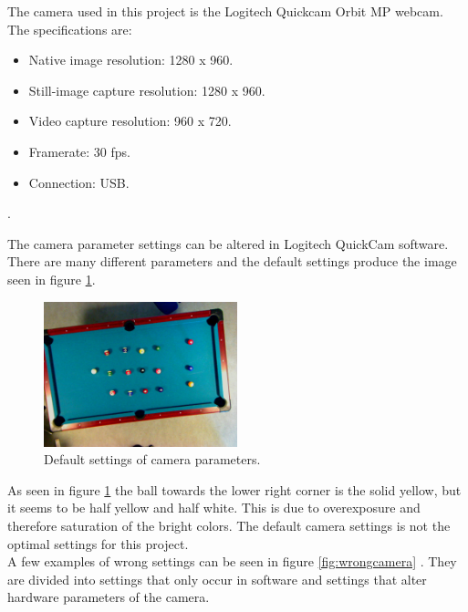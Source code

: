 The camera used in this project is the Logitech Quickcam Orbit MP webcam. The specifications are:

\begin{itemize}
\setlength{\itemsep}{0mm}
	\item Native image resolution: 1280 x 960.
	\item Still-image capture resolution: 1280 x 960.
	\item Video capture resolution: 960 x 720.
	\item Framerate: 30 fps.
	\item Connection: USB.
\end{itemize}.

The camera parameter settings can be altered in Logitech QuickCam software. There are many different parameters and the default settings produce the image seen in figure \ref{fig:defaultcamera}.

\begin{figure}[H]
\begin{center}
\leavevmode
\includegraphics[width=0.5\textwidth]{images/default}
\end{center}
\caption{Default settings of camera parameters.}
\label{fig:defaultcamera}
\end{figure} 
	
As seen in figure \ref{fig:defaultcamera} the ball towards the lower right corner is the solid yellow, but it seems to be half yellow and half white. This is due to overexposure and therefore saturation of the bright colors. The default camera settings is not the optimal settings for this project.\\	

A few examples of wrong settings can be seen in figure \ref{fig:wrongcamera} . They are divided into settings that only occur in software and settings that alter hardware parameters of the camera.

